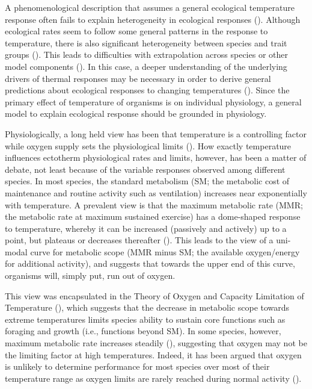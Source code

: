 \documentclass[11pt]{article}\usepackage[]{graphicx}\usepackage[]{color}
\begin{document}
A phenomenological description that assumes a general ecological temperature response often fails to explain heterogeneity in ecological responses (\cite{angilletta_temperature_2004,rall_universal_2012}). Although ecological rates seem to follow some general patterns in the response to temperature, there is also significant heterogeneity between species and trait groups (\cite[e.g., ][]{angilletta_temperature_2004,englund_temperature_2011,rall_universal_2012}). This leads to difficulties with extrapolation across species or other model components (\cite[e.g., fish in marine ecosystem models; ][]{guiet_effects_2016}). In this case, a deeper understanding of the underlying drivers of thermal responses may be necessary in order to derive general predictions about ecological responses to changing temperatures (\cite[e.g., ][]{vucic-pestic_warming_2011,lefevre_models_2017}). Since the primary effect of temperature of organisms is on individual physiology, a general model to explain ecological response should be grounded in physiology.

Physiologically, a long held view has been that temperature is a controlling factor while oxygen supply sets the physiological limits (\cite{fry_effects_1947,claireaux_linking_2007,lefevre_are_2016}). How exactly temperature influences ectotherm physiological rates and limits, however, has been a matter of debate, not least because of the variable responses observed among different species. In most species, the standard metabolism (SM; the metabolic cost of maintenance and routine activity such as ventilation) increases near exponentially with temperature. A prevalent view is that the maximum metabolic rate (MMR; the metabolic rate at maximum sustained exercise) has a dome-shaped response to temperature, whereby it can be increased (passively and actively) up to a point, but plateaus or decreases thereafter (\cite{fry_effects_1947,claireaux_linking_2007,lefevre_are_2016,portner_physiology_2008}). This leads to the view of a uni-modal curve for metabolic scope (MMR minus SM; the available oxygen/energy for additional activity), and suggests that towards the upper end of this curve, organisms will, simply put, run out of oxygen. 

This view was encapsulated in the Theory of Oxygen and Capacity Limitation of Temperature (\cite{portner_oxygen-and_2010}), which suggests that the decrease in metabolic scope towards extreme temperatures limits species ability to sustain core functions such as foraging and growth (i.e., functions beyond SM). In some species, however, maximum metabolic rate increases steadily (\cite{lefevre_are_2016, verberk_does_2016}), suggesting that oxygen may not be the limiting factor at high temperatures. Indeed, it has been argued that oxygen is unlikely to determine performance for most species over most of their temperature range as oxygen limits are rarely reached during normal activity (\cite{jutfelt_oxygen-and_2018, holt_climate_2015}). 
\end{document}
